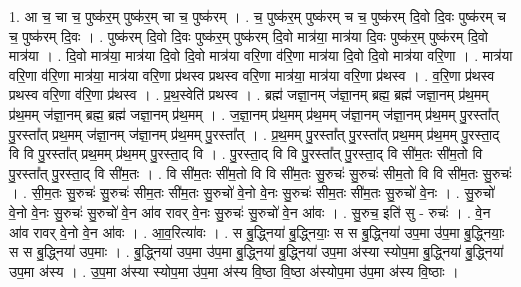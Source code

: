 \documentclass[17pt]{extarticle}
\begin{document}
1. आ च॒ चा च॒ पुष्क॑र॒म् पुष्क॑र॒म् चा च॒ पुष्क॑रम् । . च॒ पुष्क॑र॒म् पुष्क॑रम् च च॒ पुष्क॑रम् दि॒वो दि॒वः पुष्क॑रम् च च॒ पुष्क॑रम् दि॒वः । . पुष्क॑रम् दि॒वो दि॒वः पुष्क॑र॒म् पुष्क॑रम् दि॒वो मात्र॑या॒ मात्र॑या दि॒वः पुष्क॑र॒म् पुष्क॑रम् दि॒वो मात्र॑या । . दि॒वो मात्र॑या॒ मात्र॑या दि॒वो दि॒वो मात्र॑या वरि॒णा व॑रि॒णा मात्र॑या दि॒वो दि॒वो मात्र॑या वरि॒णा । . मात्र॑या वरि॒णा व॑रि॒णा मात्र॑या॒ मात्र॑या वरि॒णा प्र॑थस्व प्रथस्व वरि॒णा मात्र॑या॒ मात्र॑या वरि॒णा प्र॑थस्व । . व॒रि॒णा प्र॑थस्व प्रथस्व वरि॒णा व॑रि॒णा प्र॑थस्व । . प्र॒थ॒स्वेति॑ प्रथस्व । . ब्रह्म॑ जज्ञा॒नम् ज॑ज्ञा॒नम् ब्रह्म॒ ब्रह्म॑ जज्ञा॒नम् प्र॑थ॒मम् प्र॑थ॒मम् ज॑ज्ञा॒नम् ब्रह्म॒ ब्रह्म॑ जज्ञा॒नम् प्र॑थ॒मम् । . ज॒ज्ञा॒नम् प्र॑थ॒मम् प्र॑थ॒मम् ज॑ज्ञा॒नम् ज॑ज्ञा॒नम् प्र॑थ॒मम् पु॒रस्ता᳚त् पु॒रस्ता᳚त् प्रथ॒मम् ज॑ज्ञा॒नम् ज॑ज्ञा॒नम् प्र॑थ॒मम् पु॒रस्ता᳚त् । . प्र॒थ॒मम् पु॒रस्ता᳚त् पु॒रस्ता᳚त् प्रथ॒मम् प्र॑थ॒मम् पु॒रस्ता॒द् वि वि पु॒रस्ता᳚त् प्रथ॒मम् प्र॑थ॒मम् पु॒रस्ता॒द् वि । . पु॒रस्ता॒द् वि वि पु॒रस्ता᳚त् पु॒रस्ता॒द् वि सी॑म॒तः सी॑म॒तो वि पु॒रस्ता᳚त् पु॒रस्ता॒द् वि सी॑म॒तः । . वि सी॑म॒तः सी॑म॒तो वि वि सी॑म॒तः सु॒रुचः॑ सु॒रुचः॑ सीम॒तो वि वि सी॑म॒तः सु॒रुचः॑ । . सी॒म॒तः सु॒रुचः॑ सु॒रुचः॑ सीम॒तः सी॑म॒तः सु॒रुचो॑ वे॒नो वे॒नः सु॒रुचः॑ सीम॒तः सी॑म॒तः सु॒रुचो॑ वे॒नः । . सु॒रुचो॑ वे॒नो वे॒नः सु॒रुचः॑ सु॒रुचो॑ वे॒न आ॑व रावर् वे॒नः सु॒रुचः॑ सु॒रुचो॑ वे॒न आ॑वः । . सु॒रुच॒ इति॑ सु - रुचः॑ । . वे॒न आ॑व रावर् वे॒नो वे॒न आ॑वः । . आ॒व॒रित्या॑वः । . स बु॒द्ध्निया॑ बु॒द्ध्नियाः॒ स स बु॒द्ध्निया॑ उप॒मा उ॑प॒मा बु॒द्ध्नियाः॒ स स बु॒द्ध्निया॑ उप॒माः । . बु॒द्ध्निया॑ उप॒मा उ॑प॒मा बु॒द्ध्निया॑ बु॒द्ध्निया॑ उप॒मा अ॑स्या स्योप॒मा बु॒द्ध्निया॑ बु॒द्ध्निया॑ उप॒मा अ॑स्य । . उ॒प॒मा अ॑स्या स्योप॒मा उ॑प॒मा अ॑स्य वि॒ष्ठा वि॒ष्ठा अ॑स्योप॒मा उ॑प॒मा अ॑स्य वि॒ष्ठाः । \newline
\end{document}
